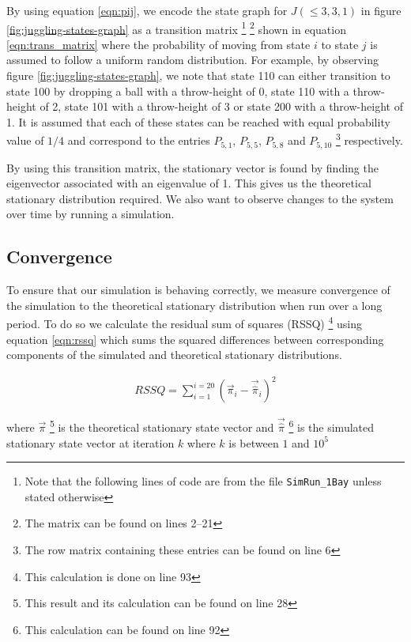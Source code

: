 \documentclass{article}
\theoremstyle{definition}
\theoremstyle{remark}
\numberwithin{equation}{section}
\begin{document}
By using equation \ref{eqn:pij}, we encode the state graph for $J(\leq 3, 3, 1)$ in figure \ref{fig:juggling-states-graph} as a transition matrix \footnote{Note that the following lines of code are from the file \lstinline|SimRun_1Bay| unless stated otherwise} \footnote{The matrix can be found on lines 2--21} shown in equation \ref{eqn:trans_matrix} where the probability of moving from state $i$ to state $j$ is assumed to follow a uniform random distribution. For example, by observing figure \ref{fig:juggling-states-graph}, we note that state 110 can either transition to state 100 by dropping a ball with a throw-height of 0, state 110 with a throw-height of 2, state 101 with a throw-height of 3 or state 200 with a throw-height of 1. It is assumed that each of these states can be reached with equal probability value of $1/4$ and correspond to the entries $P_{5,1}$, $P_{5,5}$, $P_{5,8}$ and $P_{5,10}$ \footnote{The row matrix containing these entries can be found on line 6} respectively. 

By using this transition matrix, the stationary vector is found by finding the eigenvector associated with an eigenvalue of 1. This gives us the theoretical stationary distribution  required. We also want to observe changes to the system over time by running a simulation.

\subsection{Convergence} \label{sec:conv}

To ensure that our simulation is behaving correctly, we measure convergence of the simulation to the theoretical stationary distribution when run over a long period. To do so we calculate the residual sum of squares (RSSQ) \footnote{This calculation is done on line 93 } using equation \ref{eqn:rssq} which sums the squared differences between corresponding components of the simulated and theoretical stationary distributions.

\begin{align}
    \label{eqn:rssq} RSSQ = \sum_{i=1}^{i=20}{(\vec{\pi}_i - \vec{\hat{\pi}}_i)^2}
\end{align}

where $\vec{\pi}$ \footnote{This result and its calculation can be found on line 28 } is the theoretical stationary state vector and $\vec{\hat{\pi}}$ \footnote{This calculation can be found on line 92 } is the simulated stationary state vector at iteration $k$ where $k$ is between $1$ and $10^5$
\end{document}
